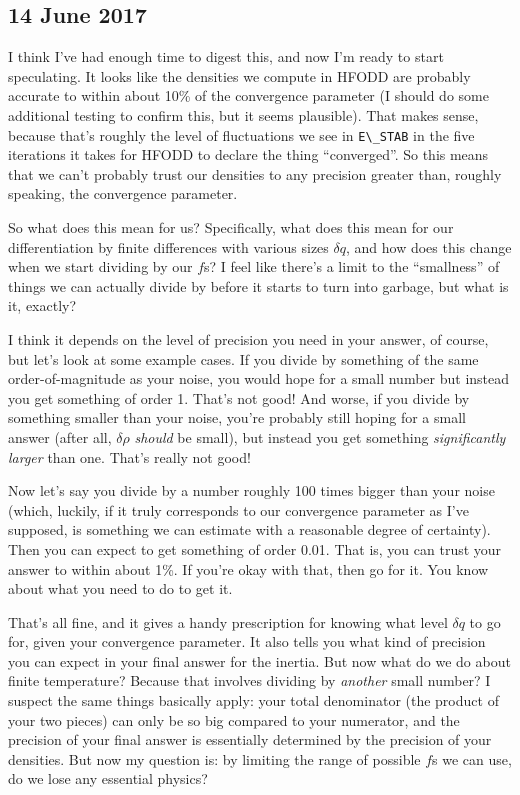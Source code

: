 \subsection*{14 June 2017}
I think I've had enough time to digest this, and now I'm ready to start speculating. It looks like the densities we compute in HFODD are probably accurate to within about 10\% of the convergence parameter (I should do some additional testing to confirm this, but it seems plausible). That makes sense, because that's roughly the level of fluctuations we see in \verb|E\_STAB| in the five iterations it takes for HFODD to declare the thing ``converged''. So this means that we can't probably trust our densities to any precision greater than, roughly speaking, the convergence parameter.

So what does this mean for us? Specifically, what does this mean for our differentiation by finite differences with various sizes $\delta q$, and how does this change when we start dividing by our $f$s? I feel like there's a limit to the ``smallness'' of things we can actually divide by before it starts to turn into garbage, but what is it, exactly?

I think it depends on the level of precision you need in your answer, of course, but let's look at some example cases. If you divide by something of the same order-of-magnitude as your noise, you would hope for a small number but instead you get something of order 1. That's not good! And worse, if you divide by something smaller than your noise, you're probably still hoping for a small answer (after all, $\delta \rho$ \textit{should} be small), but instead you get something \textit{significantly larger} than one. That's really not good!

Now let's say you divide by a number roughly 100 times bigger than your noise (which, luckily, if it truly corresponds to our convergence parameter as I've supposed, is something we can estimate with a reasonable degree of certainty). Then you can expect to get something of order 0.01. That is, you can trust your answer to within about 1\%. If you're okay with that, then go for it. You know about what you need to do to get it.

That's all fine, and it gives a handy prescription for knowing what level $\delta q$ to go for, given your convergence parameter. It also tells you what kind of precision you can expect in your final answer for the inertia. But now what do we do about finite temperature? Because that involves dividing by \textit{another} small number? I suspect the same things basically apply: your total denominator (the product of your two pieces) can only be so big compared to your numerator, and the precision of your final answer is essentially determined by the precision of your densities. But now my question is: by limiting the range of possible $f$s we can use, do we lose any essential physics?

